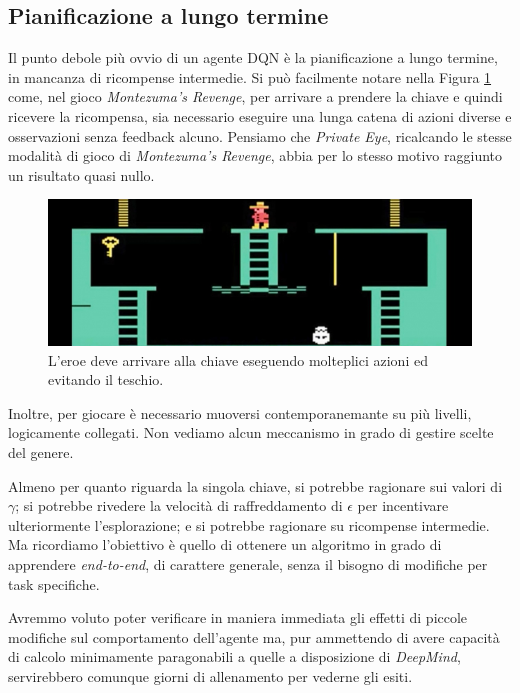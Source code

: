\documentclass[twoside,twocolumn,10pt]{extarticle}
\theoremstyle{definition}
\begin{document}
	\subsection{Pianificazione a lungo termine}
		Il punto debole più ovvio di un agente DQN è la pianificazione a lungo termine, in mancanza di ricompense intermedie. Si può facilmente notare nella Figura \ref{fig:montezuma} come, nel gioco \textit{Montezuma's Revenge}, per arrivare a prendere la chiave e quindi ricevere la ricompensa, sia necessario eseguire una lunga catena di azioni diverse e osservazioni senza feedback alcuno. Pensiamo che \textit{Private Eye}, ricalcando le stesse modalità di gioco di \textit{Montezuma's Revenge}, abbia per lo stesso motivo raggiunto un risultato quasi nullo.
		\begin{figure}[ht!]
			\centering
			\includegraphics[scale=.31]{images/montezuma.jpg}
			\caption{L'eroe deve arrivare alla chiave eseguendo molteplici azioni ed evitando il teschio.}
			\label{fig:montezuma}
		\end{figure}
		Inoltre, per giocare è necessario muoversi contemporanemante su più livelli, logicamente collegati. Non vediamo alcun meccanismo in grado di gestire scelte del genere.
		
		Almeno per quanto riguarda la singola chiave, si potrebbe ragionare sui valori di $\gamma$; si potrebbe rivedere la velocità di raffreddamento di $\epsilon$ per incentivare ulteriormente l'esplorazione; e si potrebbe ragionare su ricompense intermedie. Ma ricordiamo l'obiettivo è quello di ottenere un algoritmo in grado di apprendere \textit{end-to-end}, di carattere generale, senza il bisogno di modifiche per task specifiche.
		
		Avremmo voluto poter verificare in maniera immediata gli effetti di piccole modifiche sul comportamento dell'agente ma, pur ammettendo di avere capacità di calcolo minimamente paragonabili a quelle a disposizione di \textit{DeepMind}, servirebbero comunque giorni di allenamento per vederne gli esiti.
\end{document}
